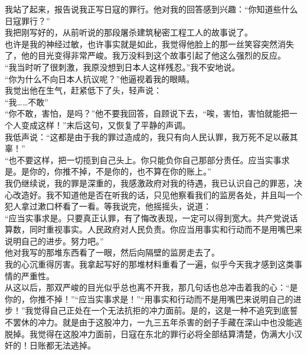 我站了起来，报告说我正写日寇的罪行。他对我的回答感到兴趣：“你知道些什么日寇罪行？”\\

我把刚写好的，从前听说的那段屠杀建筑秘密工程工人的故事说了。\\

也许是我的神经过敏，也许事实就是如此，我觉得他脸上的那一丝笑容突然消失了，他的目光变得非常严峻。我万没料到这个故事引起了他这么强烈的反应。\\

“我当时听了很刺激，我原没想到日本人这样残忍。”我不安地说。\\

“你为什么不向日本人抗议呢？”他逼视着我的眼睛。\\

我觉出他在生气，赶紧低下了头，轻声说：\\

“我……不敢”\\

“你不敢，害怕，是吗？”他不要我回答，自顾说下去，“唉，害怕，害怕就能把一个人变成这样！”末后这句，又恢复了平静的声调。\\

我低声说：“这都是由于我的罪过造成的，我只有向人民认罪，我万死不足以蔽其辜！”\\

“也不要这样，把一切揽到自己头上。你只能负你自己那部分责任。应当实事求是。是你的，你推不掉，不是你的，也不算在你的账上。”\\

我仍继续说，我的罪是深重的，我感激政府对我的待遇，我已认识自己的罪恶，决心改造好。我不知道他是否在听我的话，只见他察看我们的监房各处，并且叫一个犯人拿过漱口杯看了一看。等我说完，他摇摇头，说道：\\

“应当实事求是。只要真正认罪，有了悔改表现，一定可以得到宽大。共产党说话算数，同时重视事实。人民政府对人民负责。你应当用事实和行动而不是用嘴巴来说明自己的进步。努力吧。”\\

他对我写的那堆东西看了一眼，然后向隔壁的监房走去了。\\

我的心沉重得厉害。我拿起写好的那堆材料重看了一遍，似乎今天我才感到这类事情的严重性。\\

从这以后，那双严峻的目光似乎总也离不开我，那几句话也总冲击着我的心：“是你的，你推不掉！”“应当实事求是！”“用事实和行动而不是用嘴巴来说明自己的进步！”我觉得自己正处在一个无法抗拒的冲力面前。是的，这是一种不追究到底誓不罢休的冲力。就是由于这股冲力，一九三五年杀害的刽子手藏在深山中也没能逃脱掉。我觉得在这股冲力面前，日寇在东北的罪行必将全部结算清楚，伪满大小汉奸的！日账都无法逃掉。\\

